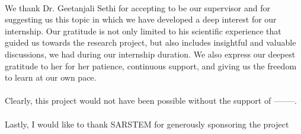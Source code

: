 \begin{acknowledgements}
\vspace*{-3mm}{\textcolor{white}{Abstract}}\\
We thank Dr. Geetanjali Sethi for accepting to be our supervisor
and for suggesting us this topic in which we have developed a deep interest for our internship. Our gratitude is not only limited to his scientific experience that guided us towards the research project, but also includes insightful and valuable discussions, we had during our internship duration. We also express our deepest gratitude to her for her patience, continuous support, and giving us the freedom to learn at our own pace. \\\\
Clearly, this project would not have been possible without the support of --------. \\\\

Lastly, I would like to thank SARSTEM for generously sponsoring the project \\\\

\end{acknowledgements}
\restoregeometry
